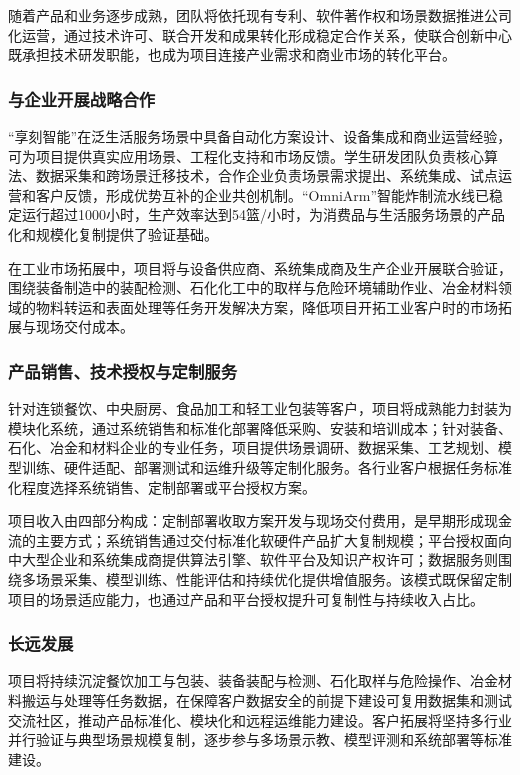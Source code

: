 \documentclass[zihao=-4]{ctexart}
\begin{document}
随着产品和业务逐步成熟，团队将依托现有专利、软件著作权和场景数据推进公司化运营，通过技术许可、联合开发和成果转化形成稳定合作关系，使联合创新中心既承担技术研发职能，也成为项目连接产业需求和商业市场的转化平台。

\subsubsection{与企业开展战略合作}

“享刻智能”在泛生活服务场景中具备自动化方案设计、设备集成和商业运营经验，可为项目提供真实应用场景、工程化支持和市场反馈。学生研发团队负责核心算法、数据采集和跨场景迁移技术，合作企业负责场景需求提出、系统集成、试点运营和客户反馈，形成优势互补的企业共创机制。“OmniArm”智能炸制流水线已稳定运行超过1000小时，生产效率达到54篮/小时，为消费品与生活服务场景的产品化和规模化复制提供了验证基础。

在工业市场拓展中，项目将与设备供应商、系统集成商及生产企业开展联合验证，围绕装备制造中的装配检测、石化化工中的取样与危险环境辅助作业、冶金材料领域的物料转运和表面处理等任务开发解决方案，降低项目开拓工业客户时的市场拓展与现场交付成本。

\subsubsection{产品销售、技术授权与定制服务}

针对连锁餐饮、中央厨房、食品加工和轻工业包装等客户，项目将成熟能力封装为模块化系统，通过系统销售和标准化部署降低采购、安装和培训成本；针对装备、石化、冶金和材料企业的专业任务，项目提供场景调研、数据采集、工艺规划、模型训练、硬件适配、部署测试和运维升级等定制化服务。各行业客户根据任务标准化程度选择系统销售、定制部署或平台授权方案。

项目收入由四部分构成：定制部署收取方案开发与现场交付费用，是早期形成现金流的主要方式；系统销售通过交付标准化软硬件产品扩大复制规模；平台授权面向中大型企业和系统集成商提供算法引擎、软件平台及知识产权许可；数据服务则围绕多场景采集、模型训练、性能评估和持续优化提供增值服务。该模式既保留定制项目的场景适应能力，也通过产品和平台授权提升可复制性与持续收入占比。

\subsubsection{长远发展}

项目将持续沉淀餐饮加工与包装、装备装配与检测、石化取样与危险操作、冶金材料搬运与处理等任务数据，在保障客户数据安全的前提下建设可复用数据集和测试交流社区，推动产品标准化、模块化和远程运维能力建设。客户拓展将坚持多行业并行验证与典型场景规模复制，逐步参与多场景示教、模型评测和系统部署等标准建设。
\end{document}
